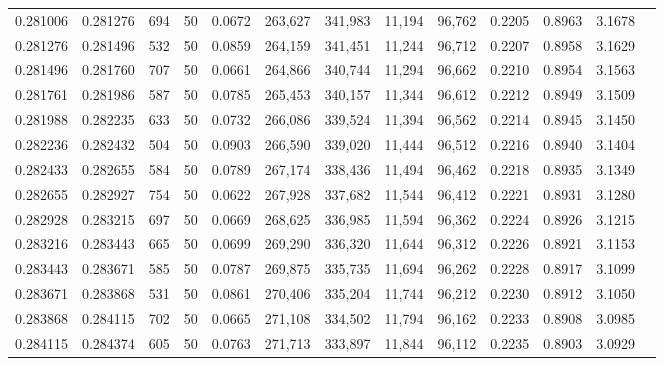 \begin{tabular}{rrrrrrrrrrrrr}
0.281006 & 0.281276 &   694 &  50 &                                     0.0672 & 263,627 & 341,983 &  11,194 &  96,762 & 0.2205 & 0.8963 & 3.1678 \\
0.281276 & 0.281496 &   532 &  50 &                                     0.0859 & 264,159 & 341,451 &  11,244 &  96,712 & 0.2207 & 0.8958 & 3.1629 \\
0.281496 & 0.281760 &   707 &  50 &                                     0.0661 & 264,866 & 340,744 &  11,294 &  96,662 & 0.2210 & 0.8954 & 3.1563 \\
0.281761 & 0.281986 &   587 &  50 &                                     0.0785 & 265,453 & 340,157 &  11,344 &  96,612 & 0.2212 & 0.8949 & 3.1509 \\
0.281988 & 0.282235 &   633 &  50 &                                     0.0732 & 266,086 & 339,524 &  11,394 &  96,562 & 0.2214 & 0.8945 & 3.1450 \\
0.282236 & 0.282432 &   504 &  50 &                                     0.0903 & 266,590 & 339,020 &  11,444 &  96,512 & 0.2216 & 0.8940 & 3.1404 \\
0.282433 & 0.282655 &   584 &  50 &                                     0.0789 & 267,174 & 338,436 &  11,494 &  96,462 & 0.2218 & 0.8935 & 3.1349 \\
0.282655 & 0.282927 &   754 &  50 &                                     0.0622 & 267,928 & 337,682 &  11,544 &  96,412 & 0.2221 & 0.8931 & 3.1280 \\
0.282928 & 0.283215 &   697 &  50 &                                     0.0669 & 268,625 & 336,985 &  11,594 &  96,362 & 0.2224 & 0.8926 & 3.1215 \\
0.283216 & 0.283443 &   665 &  50 &                                     0.0699 & 269,290 & 336,320 &  11,644 &  96,312 & 0.2226 & 0.8921 & 3.1153 \\
0.283443 & 0.283671 &   585 &  50 &                                     0.0787 & 269,875 & 335,735 &  11,694 &  96,262 & 0.2228 & 0.8917 & 3.1099 \\
0.283671 & 0.283868 &   531 &  50 &                                     0.0861 & 270,406 & 335,204 &  11,744 &  96,212 & 0.2230 & 0.8912 & 3.1050 \\
0.283868 & 0.284115 &   702 &  50 &                                     0.0665 & 271,108 & 334,502 &  11,794 &  96,162 & 0.2233 & 0.8908 & 3.0985 \\
0.284115 & 0.284374 &   605 &  50 &                                     0.0763 & 271,713 & 333,897 &  11,844 &  96,112 & 0.2235 & 0.8903 & 3.0929 \\

\end{tabular}
